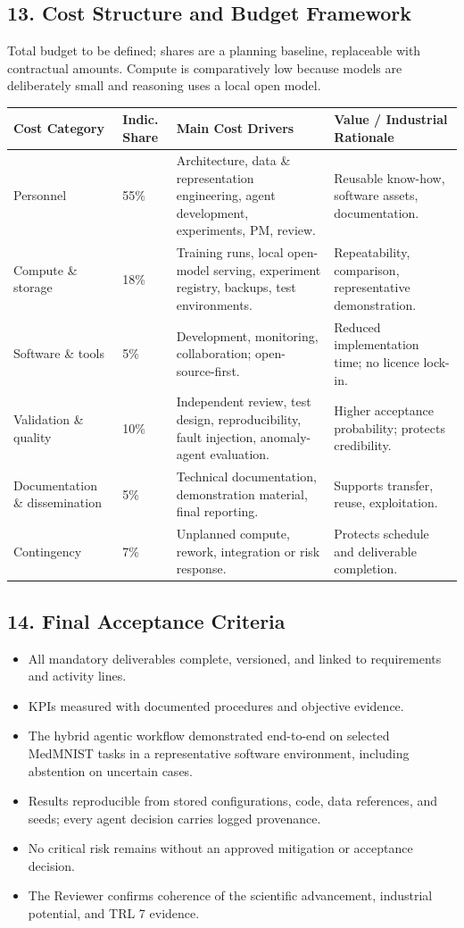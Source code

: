 \documentclass[11pt,a4paper]{article}
\newcommand{\hd}[1]{\cellcolor{hdr}\textbf{#1}}
\begin{document}
\subsection*{13. Cost Structure and Budget Framework}
Total budget to be defined; shares are a planning baseline, replaceable with contractual amounts. Compute is comparatively low because models are deliberately small and reasoning uses a local open model.

\vspace{4pt}
\noindent
\begin{tabularx}{\textwidth}{|P{3.1cm}|Y{1.9cm}|L|L|}
\hline
\hd{Cost Category} & \hd{Indic. Share} & \hd{Main Cost Drivers} & \hd{Value / Industrial Rationale} \\ \hline
Personnel & 55\% & Architecture, data \& representation engineering, agent development, experiments, PM, review. & Reusable know-how, software assets, documentation. \\ \hline
Compute \& storage & 18\% & Training runs, local open-model serving, experiment registry, backups, test environments. & Repeatability, comparison, representative demonstration. \\ \hline
Software \& tools & 5\% & Development, monitoring, collaboration; open-source-first. & Reduced implementation time; no licence lock-in. \\ \hline
Validation \& quality & 10\% & Independent review, test design, reproducibility, fault injection, anomaly-agent evaluation. & Higher acceptance probability; protects credibility. \\ \hline
Documentation \& dissemination & 5\% & Technical documentation, demonstration material, final reporting. & Supports transfer, reuse, exploitation. \\ \hline
Contingency & 7\% & Unplanned compute, rework, integration or risk response. & Protects schedule and deliverable completion. \\ \hline
\end{tabularx}

\subsection*{14. Final Acceptance Criteria}
\begin{itemize}
\item All mandatory deliverables complete, versioned, and linked to requirements and activity lines.
\item KPIs measured with documented procedures and objective evidence.
\item The hybrid agentic workflow demonstrated end-to-end on selected MedMNIST tasks in a representative software environment, including abstention on uncertain cases.
\item Results reproducible from stored configurations, code, data references, and seeds; every agent decision carries logged provenance.
\item No critical risk remains without an approved mitigation or acceptance decision.
\item The Reviewer confirms coherence of the scientific advancement, industrial potential, and TRL 7 evidence.
\end{itemize}

\vspace{6pt}
\end{document}
